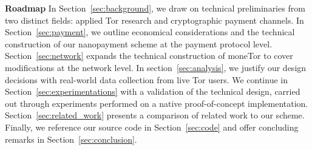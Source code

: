 \textbf{Roadmap} In Section~\ref{sec:background}, we draw on technical
preliminaries from two distinct fields: applied Tor research and cryptographic
payment channels.
In Section~\ref{sec:payment}, we outline economical considerations and the
technical construction of our nanopayment scheme at the payment protocol level.
Section~\ref{sec:network} expands the technical construction of moneTor to cover
modifications at the network level. In section~\ref{sec:analysis}, we justify
our design decisions with real-world data collection from live Tor users. We
continue in Section~\ref{sec:experimentations} with a validation of the
technical design, carried out through experiments performed on a native
proof-of-concept implementation. Section~\ref{sec:related_work} presents a
comparison of related work to our scheme. Finally, we reference our source code
in Section~\ref{sec:code} and offer concluding remarks in
Section~\ref{sec:conclusion}.

